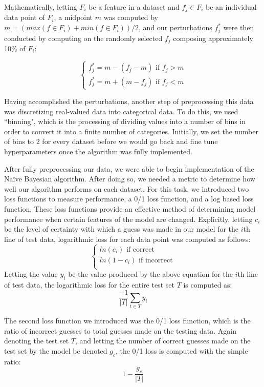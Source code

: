 \documentclass[twoside,11pt]{article}
\begin{document}
Mathematically, letting $F_i$ be a feature in a dataset and $f _j\in F_i$ be an individual data point of $F_i$, a midpoint $m$ was computed by
$m = (max(f \in F_i) + min(f \in F_i))/2$, and our perturbations $f_j^*$ were then conducted by computing on the randomly selected $f_j$
composing approximately 10\% of $F_i$:

\[\begin{cases}
	f_j^*=m-(f_j-m) \text{ if $f_j > m$}\\
	f_j^*=m+(m-f_j) \text{ if $f_j < m$}
	\end{cases}\]

	
Having accomplished the perturbations, another step of preprocessing this data was discretizing real-valued data into categorical data. To do this, we used ``binning", 
which is the processing of dividing values into a number of bins in order to convert it into a finite number of categories. Initially, we
set the number of bins to 2 for every dataset before we would go back and fine tune hyperparameters once the algorithm was fully implemented.

After fully preprocessing our data, we were able to begin implementation of the Na{\"i}ve Bayesian algorithm. After doing so, we needed a metric to determine how well 
our algorithm performs on each dataset. For this task, we introduced two loss functions to measure performance, a 0/1 loss function, and a log based loss function. 
These loss functions provide an effective method of determining model performance when certain features of the model are changed. Explicitly, letting $c_i$ be the level 
of certainty with which a guess was made in our model for the $i$th line of test data, logarithmic loss for each data point was computed as follows:
\[\begin{cases}
	ln(c_i) \text{ if correct}\\
	ln(1-c_i) \text{ if incorrect}\\
\end{cases}\]
Letting the value $y_i$ be the value produced by the above equation for the $i$th line of test data, the logarithmic loss  for the entire test set $T$ is computed
as:
\begin{equation}
\frac{-1}{|T|}\sum_{t \in T}^{ } y_i
\end{equation}

The second loss function we introduced was the 0/1 loss function, which is the ratio of incorrect guesses to total guesses made on the testing data.
Again denoting the test set $T$, and letting the number of correct guesses made on the test set by the model be denoted $g_c$, the 0/1 loss is computed with the simple ratio:
\begin{equation}
	1 - \frac{g_c}{|T|}
\end{equation}
\end{document}
